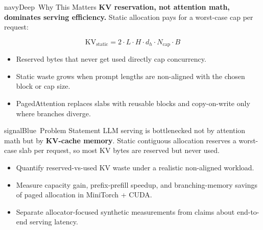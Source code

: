 \documentclass[17pt]{extarticle}
\newlength{\PosterColumnHeight}
\newcommand{\bodycopy}{\fontsize{31.5}{36.8}\selectfont}
\newcommand{\subhead}[1]{\par\vspace{2mm}{\fontsize{30}{35}\selectfont\bfseries\textcolor{navyDeep}{#1}}\par\vspace{1mm}}
\newcommand{\blockgap}{\par\vspace{1.2mm plus 0.55fill}}
\newenvironment{postercolumn}{%
\begin{minipage}[t][\PosterColumnHeight][s]{0.321\linewidth}
\vspace{0pt}%
}{%
\end{minipage}%
}
\begin{document}
\begin{postercolumn}
\begin{posterbox}{navyDeep}{\faLightbulb\ Why This Matters}
\bodycopy
\textbf{KV reservation, not attention math, dominates serving efficiency.} Static allocation pays for a worst-case cap per request:

\begin{tcolorbox}[enhanced, arc=3mm, boxrule=0pt,
      colback=panelBg, left=4mm, right=4mm, top=2.5mm, bottom=2.5mm,
      before skip=4mm, after skip=4mm]
\[
\text{KV}_{\text{static}} = 2 \cdot L \cdot H \cdot d_h \cdot N_{\text{cap}} \cdot B
\]
\end{tcolorbox}

\begin{itemize}
      \item Reserved bytes that never get used directly cap concurrency.
      \item Static waste grows when prompt lengths are non-aligned with the chosen block or cap size.
      \item PagedAttention replaces slabs with reusable blocks and copy-on-write only where branches diverge.
\end{itemize}
\end{posterbox}

\blockgap

\begin{posterbox}{signalBlue}{\faBullseye\ Problem Statement}
\bodycopy
LLM serving is bottlenecked not by attention math but by \textbf{KV-cache memory}. Static contiguous allocation reserves a worst-case slab per request, so most KV bytes are reserved but never used.

\subhead{Goals}
\begin{itemize}
      \item Quantify reserved-vs-used KV waste under a realistic non-aligned workload.
      \item Measure capacity gain, prefix-prefill speedup, and branching-memory savings of paged allocation in MiniTorch + CUDA.
      \item Separate allocator-focused synthetic measurements from claims about end-to-end serving latency.
\end{itemize}
\end{posterbox}

\blockgap


\end{postercolumn}
\end{document}
